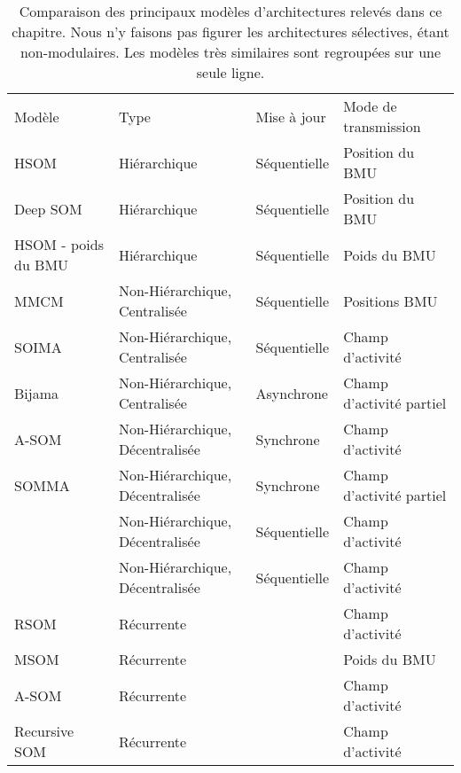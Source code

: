 \documentclass[../main]{subfiles}
\begin{document}
\begin{table}[t!]
    \renewcommand{\arraystretch}{1.5}
    \caption{Comparaison des principaux modèles d'architectures relevés dans ce chapitre. Nous n'y faisons pas figurer les architectures sélectives, étant non-modulaires. Les modèles très similaires sont regroupées sur une seule ligne. \label{tab:bib}}
    \vspace{5mm}
    \begin{tabular}{p{2cm}p{6cm}p{2cm}p{5cm}}
        Modèle& Type& Mise à jour& Mode de transmission    \\
        HSOM\tnote{1}& Hiérarchique & Séquentielle & Position du BMU  \\
        Deep SOM\tnote{2} & Hiérarchique & Séquentielle & Position du BMU   \\
        HSOM - poids du BMU\tnote{3} & Hiérarchique & Séquentielle & Poids du BMU \\
        \hline
        MMCM \tnote{4} & Non-Hiérarchique, Centralisée & Séquentielle    & Positions BMU    \\                  
        SOIMA\tnote{5} & Non-Hiérarchique, Centralisée & Séquentielle    & Champ d'activité \\
        Bijama\tnote{6} & Non-Hiérarchique, Centralisée&   Asynchrone    & Champ d'activité partiel \\ 
        A-SOM  \tnote{7} & Non-Hiérarchique, Décentralisée       & Synchrone       & Champ d'activité \\
        SOMMA  \tnote{8}          & Non-Hiérarchique, Décentralisée       & Synchrone       & Champ d'activité partiel \\
        \cite{jayaratne_bio-inspired_2018}           & Non-Hiérarchique, Décentralisée       & Séquentielle    & Champ d'activité \\
        \cite{khacef_brain-inspired_2020}            & Non-Hiérarchique, Décentralisée       & Séquentielle    & Champ d'activité \\
        \hline
        RSOM  \tnote{9}      & Récurrente                            &                & Champ d'activité \\
        MSOM   \tnote{10}& Récurrente                                   &                & Poids du BMU\\
        A-SOM   \tnote{11}& Récurrente                            &                & Champ d'activité\\
        Recursive SOM \tnote{12}& Récurrente                            &                & Champ d'activité\\

\end{tabular}
\end{table}
\end{document}
